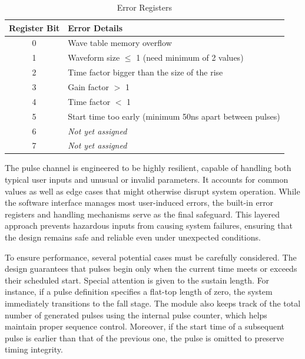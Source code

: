 \begin{table}[ht]
\setlength{\abovecaptionskip}{5pt}    %
\setlength{\belowcaptionskip}{5pt}    %
\centering
\caption{Error Registers}
\label{table:erro_regs}
\begin{tabular}{|c|l|}
\hline
Register Bit & Error Details \\
\hline
0 & Wave table memory overflow \\
\hline
1 & Waveform size $\leq$ 1 (need minimum of 2 values) \\
\hline
2 & Time factor bigger than the size of the rise \\
\hline
3 & Gain factor $>$ 1 \\
\hline
4 & Time factor $<$ 1 \\
\hline
5 & Start time too early (minimum 50ns apart between pulses) \\
\hline
6 & \textit{Not yet assigned} \\
\hline
7 & \textit{Not yet assigned} \\
\hline
\end{tabular}
\end{table}

The pulse channel is engineered to be highly resilient, capable of handling both typical user inputs and unusual or invalid parameters. It accounts for common values as well as edge cases that might otherwise disrupt system operation. While the software interface manages most user-induced errors, the built-in error registers and handling mechanisms serve as the final safeguard. This layered approach prevents hazardous inputs from causing system failures, ensuring that the design remains safe and reliable even under unexpected conditions.

To ensure performance, several potential cases must be carefully considered. The design guarantees that pulses begin only when the current time meets or exceeds their scheduled start. Special attention is given to the sustain length. For instance, if a pulse definition specifies a flat-top length of zero, the system immediately transitions to the fall stage. The module also keeps track of the total number of generated pulses using the internal pulse counter, which helps maintain proper sequence control. Moreover, if the start time of a subsequent pulse is earlier than that of the previous one, the pulse is omitted to preserve timing integrity.

